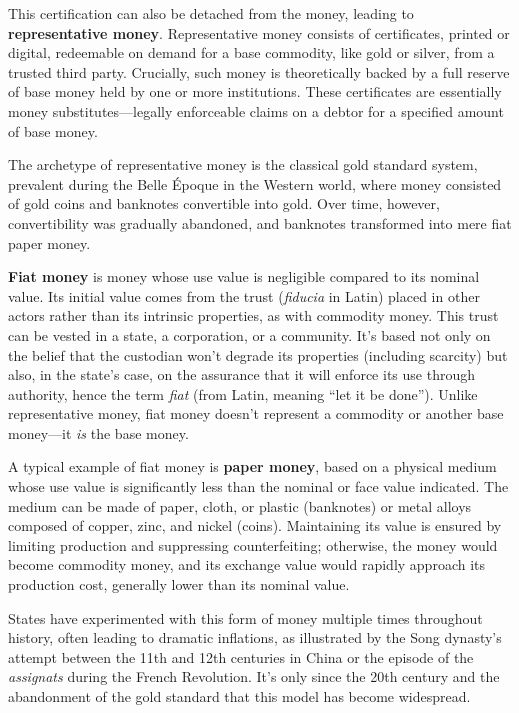 \documentclass[
  a5paper,
  smalldemyvopaper,10pt,twoside,onecolumn,openright,extrafontsizes,hidelinks]{memoir}
\begin{document}
This certification can also be detached from the money, leading to
\textbf{representative money}. Representative money consists of
certificates, printed or digital, redeemable on demand for a base
commodity, like gold or silver, from a trusted third party. Crucially,
such money is theoretically backed by a full reserve of base money held
by one or more institutions. These certificates are essentially money
substitutes---legally enforceable claims on a debtor for a specified
amount of base money.

The archetype of representative money is the classical gold standard
system, prevalent during the Belle Époque in the Western world, where
money consisted of gold coins and banknotes convertible into gold. Over
time, however, convertibility was gradually abandoned, and banknotes
transformed into mere fiat paper money.

\textbf{Fiat money} is money whose use value is negligible compared to
its nominal value. Its initial value comes from the trust
(\emph{fiducia} in Latin) placed in other actors rather than its
intrinsic properties, as with commodity money. This trust can be vested
in a state, a corporation, or a community. It's based not only on the
belief that the custodian won't degrade its properties (including
scarcity) but also, in the state's case, on the assurance that it will
enforce its use through authority, hence the term \emph{fiat} (from
Latin, meaning ``let it be done''). Unlike representative money, fiat
money doesn't represent a commodity or another base money---it \emph{is}
the base money.

A typical example of fiat money is \textbf{paper money}, based on a
physical medium whose use value is significantly less than the nominal
or face value indicated. The medium can be made of paper, cloth, or
plastic (banknotes) or metal alloys composed of copper, zinc, and nickel
(coins). Maintaining its value is ensured by limiting production and
suppressing counterfeiting; otherwise, the money would become commodity
money, and its exchange value would rapidly approach its production
cost, generally lower than its nominal value.

States have experimented with this form of money multiple times
throughout history, often leading to dramatic inflations, as illustrated
by the Song dynasty's attempt between the 11th and 12th centuries in
China or the episode of the \emph{assignats} during the French
Revolution. It's only since the 20th century and the abandonment of the
gold standard that this model has become widespread.
\end{document}
